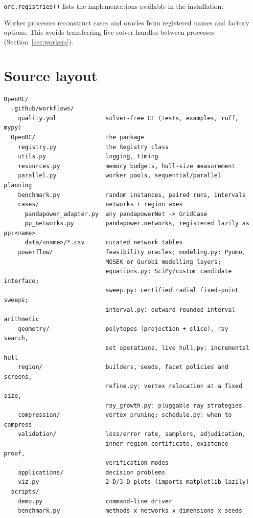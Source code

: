 \documentclass[11pt,a4paper]{report}
\newcommand{\why}[1]{\par\medskip\begingroup\noindent #1\par\endgroup\medskip}
\newcommand{\code}[1]{\texttt{\small #1}}
\begin{document}
\code{orc.registries()} lists the implementations available in the installation.

\why{Worker processes reconstruct cases and oracles from registered names and
factory options. This avoids transferring live solver handles between
processes (Section~\ref{sec:workers}).}

\clearpage
\section{Source layout}

\begin{lstlisting}[style=sh,basicstyle=\ttfamily\scriptsize]
OpenRC/
  .github/workflows/
    quality.yml              solver-free CI (tests, examples, ruff, mypy)
  OpenRC/                    the package
    registry.py              the Registry class
    utils.py                 logging, timing
    resources.py             memory budgets, hull-size measurement
    parallel.py              worker pools, sequential/parallel planning
    benchmark.py             random instances, paired runs, intervals
    cases/                   networks + region axes
      pandapower_adapter.py  any pandapowerNet -> GridCase
      pp_networks.py         pandapower.networks, registered lazily as pp:<name>
      data/<name>/*.csv      curated network tables
    powerflow/               feasibility oracles; modeling.py: Pyomo,
                             MOSEK or Gurobi modelling layers;
                             equations.py: SciPy/custom candidate interface;
                             sweep.py: certified radial fixed-point sweeps;
                             interval.py: outward-rounded interval arithmetic
    geometry/                polytopes (projection + slice), ray search,
                             set operations, live_hull.py: incremental hull
    region/                  builders, seeds, facet policies and screens,
                             refine.py: vertex relocation at a fixed size,
                             ray_growth.py: pluggable ray strategies
    compression/             vertex pruning; schedule.py: when to compress
    validation/              loss/error rate, samplers, adjudication,
                             inner-region certificate, existence proof,
                             verification modes
    applications/            decision problems
    viz.py                   2-D/3-D plots (imports matplotlib lazily)
  scripts/
    demo.py                  command-line driver
    benchmark.py             methods x networks x dimensions x seeds

\end{lstlisting}
\end{document}
